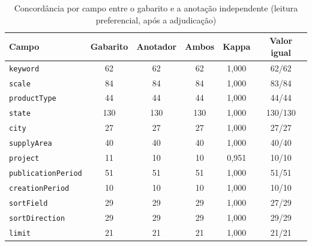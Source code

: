 \begin{table}[htbp!]
\centering
\caption{Concordância por campo entre o gabarito e a anotação independente (leitura preferencial, após a adjudicação)}
\label{tab:auditoria-campos}
\small
\begin{tabular}{|l|c|c|c|c|c|}
\hline
\textbf{Campo} & \textbf{Gabarito} & \textbf{Anotador} & \textbf{Ambos} & \textbf{Kappa} & \textbf{Valor igual} \\
\hline
\texttt{keyword} & 62 & 62 & 62 & 1,000 & 62/62 \\
\texttt{scale} & 84 & 84 & 84 & 1,000 & 83/84 \\
\texttt{productType} & 44 & 44 & 44 & 1,000 & 44/44 \\
\texttt{state} & 130 & 130 & 130 & 1,000 & 130/130 \\
\texttt{city} & 27 & 27 & 27 & 1,000 & 27/27 \\
\texttt{supplyArea} & 40 & 40 & 40 & 1,000 & 40/40 \\
\texttt{project} & 11 & 10 & 10 & 0,951 & 10/10 \\
\texttt{publicationPeriod} & 51 & 51 & 51 & 1,000 & 51/51 \\
\texttt{creationPeriod} & 10 & 10 & 10 & 1,000 & 10/10 \\
\texttt{sortField} & 29 & 29 & 29 & 1,000 & 27/29 \\
\texttt{sortDirection} & 29 & 29 & 29 & 1,000 & 29/29 \\
\texttt{limit} & 21 & 21 & 21 & 1,000 & 21/21 \\
\hline
\end{tabular}
\end{table}
